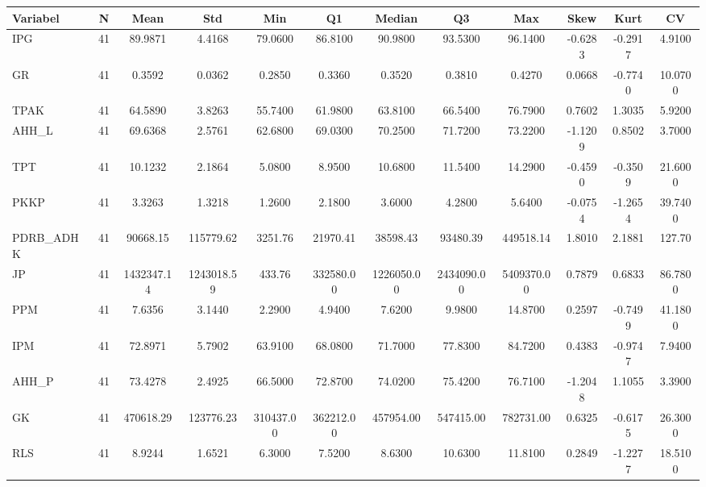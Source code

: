 \begin{adjustbox}{max width=\textwidth}
\small
\begin{tabular}{|p{2.5cm}|c|c|c|c|c|c|c|c|c|c|c|}
\hline
\textbf{Variabel} & \textbf{N} & \textbf{Mean} & \textbf{Std} & \textbf{Min} & \textbf{Q1} & \textbf{Median} & \textbf{Q3} & \textbf{Max} & \textbf{Skew} & \textbf{Kurt} & \textbf{CV} \\
\hline
IPG & 41 & 89.9871 & 4.4168 & 79.0600 & 86.8100 & 90.9800 & 93.5300 & 96.1400 & -0.6283 & -0.2917 & 4.9100 \\
GR & 41 & 0.3592 & 0.0362 & 0.2850 & 0.3360 & 0.3520 & 0.3810 & 0.4270 & 0.0668 & -0.7740 & 10.0700 \\
TPAK & 41 & 64.5890 & 3.8263 & 55.7400 & 61.9800 & 63.8100 & 66.5400 & 76.7900 & 0.7602 & 1.3035 & 5.9200 \\
AHH\_L & 41 & 69.6368 & 2.5761 & 62.6800 & 69.0300 & 70.2500 & 71.7200 & 73.2200 & -1.1209 & 0.8502 & 3.7000 \\
TPT & 41 & 10.1232 & 2.1864 & 5.0800 & 8.9500 & 10.6800 & 11.5400 & 14.2900 & -0.4590 & -0.3509 & 21.6000 \\
PKKP & 41 & 3.3263 & 1.3218 & 1.2600 & 2.1800 & 3.6000 & 4.2800 & 5.6400 & -0.0754 & -1.2654 & 39.7400 \\
PDRB\_ADHK & 41 & 90668.15 & 115779.62 & 3251.76 & 21970.41 & 38598.43 & 93480.39 & 449518.14 & 1.8010 & 2.1881 & 127.70 \\
JP & 41 & 1432347.14 & 1243018.59 & 433.76 & 332580.00 & 1226050.00 & 2434090.00 & 5409370.00 & 0.7879 & 0.6833 & 86.7800 \\
PPM & 41 & 7.6356 & 3.1440 & 2.2900 & 4.9400 & 7.6200 & 9.9800 & 14.8700 & 0.2597 & -0.7499 & 41.1800 \\
IPM & 41 & 72.8971 & 5.7902 & 63.9100 & 68.0800 & 71.7000 & 77.8300 & 84.7200 & 0.4383 & -0.9747 & 7.9400 \\
AHH\_P & 41 & 73.4278 & 2.4925 & 66.5000 & 72.8700 & 74.0200 & 75.4200 & 76.7100 & -1.2048 & 1.1055 & 3.3900 \\
GK & 41 & 470618.29 & 123776.23 & 310437.00 & 362212.00 & 457954.00 & 547415.00 & 782731.00 & 0.6325 & -0.6175 & 26.3000 \\
RLS & 41 & 8.9244 & 1.6521 & 6.3000 & 7.5200 & 8.6300 & 10.6300 & 11.8100 & 0.2849 & -1.2277 & 18.5100 \\
\hline
\end{tabular}
\end{adjustbox}
